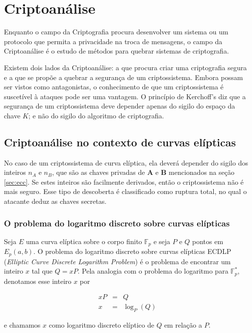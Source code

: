 %
%
\chapter{Criptoanálise}
Enquanto o campo da Criptografia procura desenvolver um sistema ou um protocolo que permita a privacidade na troca de mensagens, o campo da Criptoanálise é o estudo de métodos para quebrar sistemas de criptografia.

Existem dois lados da Criptoanálise: a que procura criar uma criptografia segura e a que se propõe a quebrar a segurança de um criptossistema. Embora possam ser vistos como antagonistas, o conhecimento de que um criptossistema é suscetível à ataques pode ser uma vantagem. O princípio de Kerchoff's diz que a segurança de um criptossistema deve depender apenas do sigilo do espaço da chave \(K\); e não do sigilo do algoritmo de criptografia. \cite{Mandy:2007}

\section{Criptoanálise no contexto de curvas elípticas}
No caso de um criptossistema de curva elíptica, ela deverá depender do sigilo dos inteiros \(n_A\) e \(n_B\), que são as chaves privadas de \textbf{A} e \textbf{B} mencionados na seção \ref{sec:ecc}. Se estes inteiros são facilmente derivados, então o criptossistema não é mais seguro. Esse tipo de descoberta é classificado como ruptura total, no qual o atacante deduz as chaves secretas. \cite{Knudsen:1998}

%
%
\subsection{O problema do logaritmo discreto sobre curvas elípticas} \label{ecdpl}
Seja \(E\) uma curva elíptica sobre o corpo finito $\mathbb{F}_p$ e seja \(P\) e \(Q\) pontos em $E_p(a, b)$. O problema do logaritmo discreto sobre curvas elípticas ECDLP (\textit{Elliptic Curve Discrete Logarithm Problem}) é o problema de encontrar um inteiro \(x\) tal que $Q = xP$. Pela analogia com o problema do logaritmo para $\mathbb{F}_p^*$, denotamos esse inteiro \(x\) por

\begin{eqnarray}
xP &=& Q \label{eq:ecdpl1} \\
x &=& \log_P(Q) \label{eq:ecdpl2}
\end{eqnarray}

e chamamos \(x\) como logaritmo discreto elíptico de \(Q\) em relação a \(P\). \cite{Hoffstein:2008}


